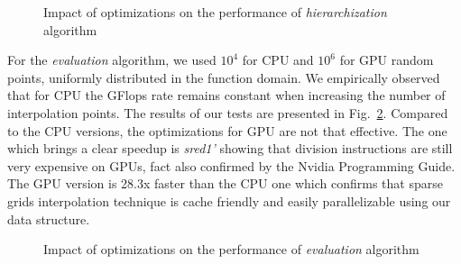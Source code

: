 \begin{figure}[h]
\begin{center}
\begin{minipage}[t]{\textwidth}%
\vspace{0cm}%
\begin{minipage}[c]{0.5\textwidth}%
\vspace{0cm}%
\begin{center}
\end{center}
\end{minipage}%
\begin{minipage}[c]{0.5\textwidth}%
\vspace{0cm}%
\begin{center}
\end{center}
\end{minipage}%
\end{minipage}%
\end{center}
\caption{Impact of optimizations on the performance of \textit{hierarchization}
algorithm}
\label{fig:hier_results}
\end{figure}

For the \textit{evaluation} algorithm, we used $10^{4}$ for CPU and $10^{6}$
for GPU random points, uniformly distributed in the function domain. We
empirically observed that for CPU the GFlops rate remains constant when
increasing the number of interpolation points. The results of our tests are
presented in Fig.~\ref{fig:eval_results}. Compared to the CPU versions, the
optimizations for GPU are not that effective. The one which brings a clear
speedup is \textit{sred1'} showing that division instructions are still very
expensive on GPUs, fact also confirmed by the Nvidia Programming Guide. The GPU
version is 28.3x faster than the CPU one which confirms that sparse grids
interpolation technique is cache friendly and easily parallelizable using our
data structure.

\begin{figure}[h]
\begin{center}
\begin{minipage}[t]{\textwidth}%
\vspace{0cm}%
\begin{minipage}[c]{0.5\textwidth}%
\vspace{0cm}%
\begin{center}
\end{center}
\end{minipage}%
\begin{minipage}[c]{0.5\textwidth}%
\vspace{0cm}%
\begin{center}
\end{center}
\end{minipage}%
\end{minipage}%
\end{center}
\caption{Impact of optimizations on the performance of \textit{evaluation}
algorithm}
\label{fig:eval_results}
\end{figure}

